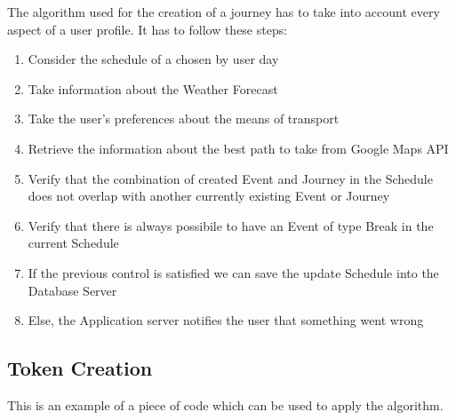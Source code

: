 \documentclass[numbers=noenddot, 12pt, a4paper, oneside]{scrbook}
\begin{document}
The algorithm used for the creation of a journey has to take into account every aspect of a user profile. It has to follow these steps:\\
\begin{enumerate}
	\item Consider the schedule of a chosen by user day
	\item Take information about the Weather Forecast
	\item Take the user's preferences about the means of transport
	\item Retrieve the information about the best path to take from Google Maps API
	\item Verify that the combination of created Event and Journey in the Schedule does not overlap with another currently existing Event or Journey
	\item Verify that there is always possibile to have an Event of type Break in the current Schedule
	\item If the previous control is satisfied we can save the update Schedule into the Database Server
	\item Else, the Application server notifies the user that something went wrong
\end{enumerate}


\subsection*{Token Creation}

This is an example of a piece of code which can be used to apply the algorithm.
\end{document}

